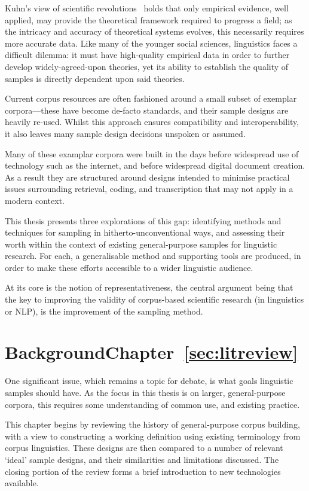 

Kuhn's view of scientific revolutions~\cite{kuhn1970structure}
holds that only empirical evidence, well applied, may provide the theoretical framework required to progress a field; as the intricacy and accuracy of theoretical systems evolves, this necessarily requires more accurate data.  Like many of the younger social sciences, linguistics faces a difficult dilemma: it must have high-quality empirical data in order to further develop widely-agreed-upon theories, yet its ability to establish the quality of samples is directly dependent upon said theories.

Current corpus resources are often fashioned around a small subset of exemplar corpora---these have become de-facto standards, and their sample designs are heavily re-used.
Whilst this approach ensures compatibility and interoperability, it also leaves many sample design decisions unspoken or assumed.

Many of these examplar corpora were built in the days before widespread use of technology such as the internet, and before widespread digital document creation.  As a result they are structured around designs intended to minimise practical issues surrounding retrieval, coding, and transcription that may not apply in a modern context.

This thesis presents three explorations of this gap: identifying methods and techniques for sampling in hitherto-unconventional ways, and assessing their worth within the context of existing general-purpose samples for linguistic research.  For each, a generalisable method and supporting tools are produced, in order to make these efforts accessible to a wider linguistic audience.

At its core is the notion of representativeness, the central argument being that the key to improving the validity of corpus-based scientific research (in linguistics or NLP), is the improvement of the sampling method.

\section{Background\hfill{}Chapter~\ref{sec:litreview}}
One significant issue, which remains a topic for debate, is what goals linguistic samples should have.  As the focus in this thesis is on larger, general-purpose corpora, this requires some understanding of common use, and existing practice.

This chapter begins by reviewing the history of general-purpose corpus building, with a view to constructing a working definition using existing terminology from corpus linguistics.  These designs are then compared to a number of relevant `ideal' sample designs, and their similarities and limitations discussed.  The closing portion of the review forms a brief introduction to new technologies available.


